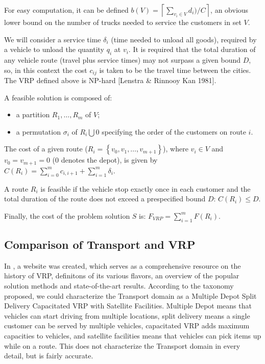 {For easy computation, it can be defined ${b(V) = \left\lceil \sum_{v_{i} \in V} d_{i}) / C \right\rceil}$, an obvious lower bound on the number of trucks needed to service the customers in set ${V}$.

We will consider a service time $\delta_{i}$ (time needed to unload all goods), required by a vehicle to unload the quantity ${q_{i}}$ at ${v_{i}}$. It is required that the total duration of any vehicle route (travel plus service times) may not surpass a given bound ${D}$, so, in this context the cost ${c_{ij}}$ is taken to be the travel time between the cities. The VRP defined above is NP-hard [Lenstra \& Rinnooy Kan 1981].

A feasible solution is composed of:

\begin{itemize}
\item a partition ${R_{1}, \ldots, R_{m}}$ of ${V}$;
\item a permutation ${\sigma_{i}}$ of ${R_{i} \bigcup {0}}$ specifying the order of the customers on route ${i}$.
\end{itemize}


The cost of a given route (${R_{i} = \left\lbrace v_{0}, v_{1}, \ldots, v_{m+1} \right\rbrace}$), where ${v_{i} \in V}$ and ${v_{0} = v_{m+1} = 0}$ (0 denotes the depot), is given by ${C(R_{i}) = \sum_{i=0}^{m} c_{i,i+1} + \sum_{i=1}^{m} \delta_{i}}$.

A route ${R_{i}}$ is feasible if the vehicle stop exactly once in each customer and the total duration of the route does not exceed a prespecified bound ${D}$: ${C(R_{i}) \leq D}$.

Finally, the cost of the problem solution ${S}$ is: ${F_{VRP} = \sum_{i=1}^{m} F(R_{i})}$.
}

\subsection{Comparison of Transport and VRP}

In \citet{ResearchGroup2013}, a website was created, which serves as a comprehensive resource on the history of VRP,
definitons of its various flavors, an overview of the popular solution methods and state-of-the-art results. According to the taxonomy proposed, we could characterize the Transport domain
as a Multiple Depot Split Delivery Capacitated VRP with Satellite Facilities. Multiple Depot
means that vehicles can start driving from multiple locations, split delivery
means a single customer can be served by multiple vehicles, capacitated VRP adds maximum
capacities to vehicles, and satellite facilities means that vehicles can pick items up
while on a route. This does not characterize the Transport domain in every detail,
but is fairly accurate.

